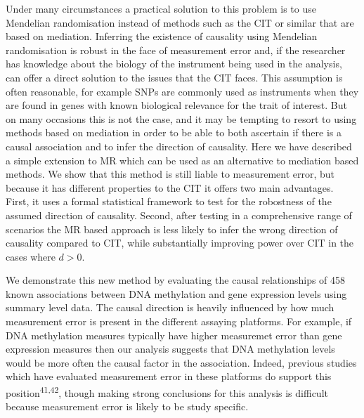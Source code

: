 \documentclass[]{article}
\begin{document}
Under many circumstances a practical solution to this problem is to use
Mendelian randomisation instead of methods such as the CIT or similar
that are based on mediation. Inferring the existence of causality using
Mendelian randomisation is robust in the face of measurement error and,
if the researcher has knowledge about the biology of the instrument
being used in the analysis, can offer a direct solution to the issues
that the CIT faces. This assumption is often reasonable, for example
SNPs are commonly used as instruments when they are found in genes with
known biological relevance for the trait of interest. But on many
occasions this is not the case, and it may be tempting to resort to
using methods based on mediation in order to be able to both ascertain
if there is a causal association and to infer the direction of
causality. Here we have described a simple extension to MR which can be
used as an alternative to mediation based methods. We show that this
method is still liable to measurement error, but because it has
different properties to the CIT it offers two main advantages. First, it
uses a formal statistical framework to test for the robostness of the
assumed direction of causality. Second, after testing in a comprehensive
range of scenarios the MR based approach is less likely to infer the
wrong direction of causality compared to CIT, while substantially
improving power over CIT in the cases where \(d > 0\).

We demonstrate this new method by evaluating the causal relationships of
458 known associations between DNA methylation and gene expression
levels using summary level data. The causal direction is heavily
influenced by how much measurement error is present in the different
assaying platforms. For example, if DNA methylation measures typically
have higher measuremet error than gene expression measures then our
analysis suggests that DNA methylation levels would be more often the
causal factor in the association. Indeed, previous studies which have
evaluated measurement error in these platforms do support this
position\textsuperscript{41,42}, though making strong conclusions for
this analysis is difficult because measurement error is likely to be
study specific.
\end{document}

